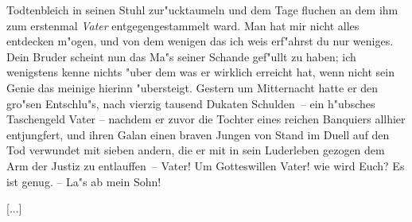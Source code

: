 \begin{drama}
\franspeaks {} \frqq Todtenbleich in seinen Stuhl zur"ucktaumeln und dem Tage fluchen an dem ihm zum erstenmal \emph{Vater} entgegengestammelt ward. Man hat mir nicht alles entdecken m"ogen, und von dem wenigen das ich weis erf"ahrst du nur weniges. Dein Bruder scheint nun das Ma"s seiner Schande gef"ullt zu haben; ich wenigstens kenne nichts "uber dem was er wirklich erreicht hat, wenn nicht sein Genie das meinige hierinn "ubersteigt. Gestern um Mitternacht hatte er den gro"sen Entschlu"s, nach vierzig tausend Dukaten Schulden\flqq \ --  ein h"ubsches Taschengeld Vater -- \frqq nachdem er zuvor die Tochter eines reichen Banquiers allhier entjungfert, und ihren Galan einen braven Jungen von Stand im Duell auf den Tod verwundet mit sieben andern, die er mit in sein Luderleben gezogen dem Arm der Justiz zu entlauffen\flqq \ -- Vater! Um Gotteswillen Vater! wie wird Euch?
\moorspeaks Es ist genug. -- La"s ab mein Sohn!

\end{drama}

[...]

\endinput